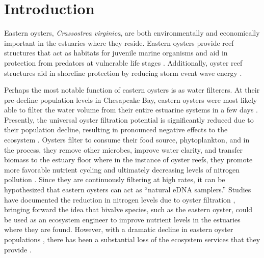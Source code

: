 \documentclass[lineno,referee,pdflatex,sn-basic]{sn-jnl}%
\begin{document}
\maketitle

\section{Introduction}
Eastern oysters, \textit{Crassostrea virginica}, are both environmentally and economically important in the estuaries where they reside. Eastern oysters provide reef structures that act as habitats for juvenile marine organisms and aid in protection from predators at vulnerable life stages \cite{coen_role_1999, harding_oyster_2001}. Additionally, oyster reef structures aid in shoreline protection by reducing storm event wave energy \cite{brandon_evidence_2016, la_peyre_assessing_2015, scyphers_oyster_2011}. 

Perhaps the most notable function of eastern oysters is as water filterers. At their pre-decline population levels in Chesapeake Bay, eastern oysters were most likely able to filter the water volume from their entire estuarine systems in a few days \cite{newell_ecological_1988}. Presently, the universal oyster filtration potential is significantly reduced due to their population decline, resulting in pronounced negative effects to the ecosystem \cite{zu_ermgassen_quantifying_2013}. Oysters filter to consume their food source, phytoplankton, and in the process, they remove other microbes, improve water clarity, and transfer biomass to the estuary floor where in the instance of oyster reefs, they promote more favorable nutrient cycling and ultimately decreasing levels of nitrogen pollution \cite{bricker_bioextractive_2020, dame_carbon_1989, ehrich_review_2015, grizzle_seston_2008, grizzle_growth_2017, higgins_nutrient_2011, higgins_effect_2013, hoellein_effect_2014, kellogg_use_2014, newell_influence_2005}. Since they are continuously filtering at high rates, it can be hypothesized that eastern oysters can act as “natural eDNA samplers.” Studies have documented the reduction in nitrogen levels due to oyster filtration \cite{bricker_role_2018, kellogg_use_2014}, bringing forward the idea that bivalve species, such as the eastern oyster, could be used as an ecosystem engineer to improve nutrient levels in the estuaries where they are found. However, with a dramatic decline in eastern oyster populations \cite{bersoza_hernandez_restoring_2018, grizzle_assessment_2016, mackenzie_causes_2007, rothschild_decline_1994}, there has been a substantial loss of the ecosystem services that they provide \cite{zu_ermgassen_quantifying_2013}.
\end{document}
